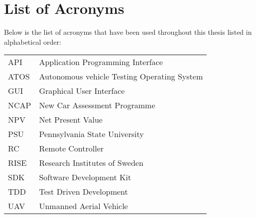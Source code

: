\thispagestyle{plain}			%
\chapter*{List of Acronyms}
Below is the list of acronyms that have been used throughout this thesis listed in alphabetical order:
\vspace*{1.0cm}

\begin{tabular}{p{3cm}p{12cm}}
API & Application Programming Interface \\
ATOS & Autonomous vehicle Testing Operating System\\
GUI & Graphical User Interface\\
NCAP & New Car Assessment Programme\\
NPV & Net Present Value \\
PSU & Pennsylvania State University\\
RC & Remote Controller\\
RISE & Research Institutes of Sweden\\
SDK & Software Development Kit \\
TDD & Test Driven Development \\
UAV & Unmanned Aerial Vehicle \\


\end{tabular}


\newpage				%
\thispagestyle{empty}
\mbox{}

